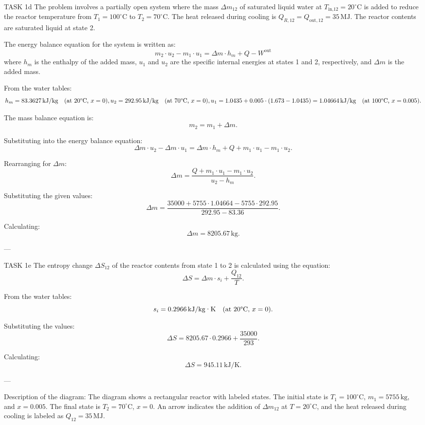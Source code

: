 TASK 1d  
The problem involves a partially open system where the mass \( \Delta m_{12} \) of saturated liquid water at \( T_{\text{in,12}} = 20^\circ\text{C} \) is added to reduce the reactor temperature from \( T_1 = 100^\circ\text{C} \) to \( T_2 = 70^\circ\text{C} \). The heat released during cooling is \( Q_{R,12} = Q_{\text{out},12} = 35 \, \text{MJ} \). The reactor contents are saturated liquid at state 2.  

The energy balance equation for the system is written as:  
\[
m_2 \cdot u_2 - m_1 \cdot u_1 = \Delta m \cdot h_m + Q - W^{\text{out}}
\]  
where \( h_m \) is the enthalpy of the added mass, \( u_1 \) and \( u_2 \) are the specific internal energies at states 1 and 2, respectively, and \( \Delta m \) is the added mass.  

From the water tables:  
\[
h_m = 83.3627 \, \text{kJ/kg} \quad \text{(at 20°C, \( x = 0 \))},  
u_2 = 292.95 \, \text{kJ/kg} \quad \text{(at 70°C, \( x = 0 \))},  
u_1 = 1.0435 + 0.005 \cdot (1.673 - 1.0435) = 1.04664 \, \text{kJ/kg} \quad \text{(at 100°C, \( x = 0.005 \))}.
\]  

The mass balance equation is:  
\[
m_2 = m_1 + \Delta m.
\]  

Substituting into the energy balance equation:  
\[
\Delta m \cdot u_2 - \Delta m \cdot u_1 = \Delta m \cdot h_m + Q + m_1 \cdot u_1 - m_1 \cdot u_2.
\]  

Rearranging for \( \Delta m \):  
\[
\Delta m = \frac{Q + m_1 \cdot u_1 - m_1 \cdot u_2}{u_2 - h_m}.
\]  

Substituting the given values:  
\[
\Delta m = \frac{35000 + 5755 \cdot 1.04664 - 5755 \cdot 292.95}{292.95 - 83.36}.
\]  

Calculating:  
\[
\Delta m = 8205.67 \, \text{kg}.
\]  

---

TASK 1e  
The entropy change \( \Delta S_{12} \) of the reactor contents from state 1 to 2 is calculated using the equation:  
\[
\Delta S = \Delta m \cdot s_i + \frac{Q_{12}}{T}.
\]  

From the water tables:  
\[
s_i = 0.2966 \, \text{kJ/kg·K} \quad \text{(at 20°C, \( x = 0 \))}.
\]  

Substituting the values:  
\[
\Delta S = 8205.67 \cdot 0.2966 + \frac{35000}{293}.
\]  

Calculating:  
\[
\Delta S = 945.11 \, \text{kJ/K}.
\]  

---

Description of the diagram:  
The diagram shows a rectangular reactor with labeled states. The initial state is \( T_1 = 100^\circ\text{C} \), \( m_1 = 5755 \, \text{kg} \), and \( x = 0.005 \). The final state is \( T_2 = 70^\circ\text{C} \), \( x = 0 \). An arrow indicates the addition of \( \Delta m_{12} \) at \( T = 20^\circ\text{C} \), and the heat released during cooling is labeled as \( Q_{12} = 35 \, \text{MJ} \).